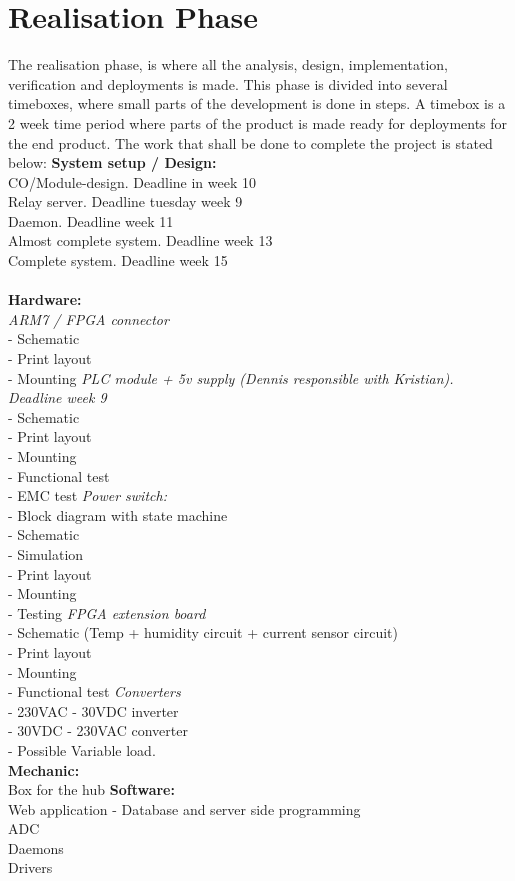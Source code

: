 \chapter{Realisation Phase}
The realisation phase, is where all the analysis, design, implementation, verification and deployments is made. This phase is divided into several timeboxes, where small parts of the development is done in steps. A timebox is a 2 week time period where parts of the product is made ready for deployments for the end product.
\p The work that shall be done to complete the project is stated below:\p
\textbf{System setup / Design:}\cite{greenwade93}\\
CO/Module-design. Deadline in week 10\\
Relay server. Deadline tuesday week 9\\
Daemon. Deadline week 11\\
Almost complete system. Deadline week 13\\
Complete system. Deadline week 15\\
\\
\textbf{Hardware:}\\
\textit{ARM7 / FPGA connector}\\
- Schematic\\
- Print layout\\
- Mounting\p
\textit{PLC module + 5v supply (Dennis responsible with Kristian). Deadline week 9}\\
- Schematic\\
- Print layout\\
- Mounting\\
- Functional test\\
- EMC test\p
\textit{Power switch:}\\
	- Block diagram with state machine\\
	- Schematic\\
	- Simulation\\
	- Print layout\\
	- Mounting\\
	- Testing\p
\textit{FPGA extension board}\\
- Schematic (Temp + humidity circuit + current sensor circuit)\\
- Print layout\\
- Mounting\\
- Functional test\p
\textit{Converters}\\
- 230VAC - 30VDC inverter\\
- 30VDC - 230VAC converter\\
- Possible Variable load.\\\p
\textbf{Mechanic:}\\
Box for the hub\p
\textbf{Software:}\\
Web application - Database and server side programming\\
ADC\\
Daemons\\
Drivers\\


